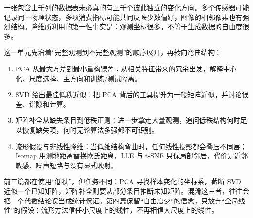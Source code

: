 一张包含上千列的数据表未必真的有上千个彼此独立的变化方向。多个传感器可能记录同一物理状态，多项消费指标可能共同反映少数偏好，图像的相邻像素也有强烈结构。降维所利用的第一性事实是：观测坐标很多，不等于生成数据的自由度很多。

这一单元先沿着``完整观测到不完整观测''的顺序展开，再转向弯曲结构：

\begin{enumerate}
\def\labelenumi{\arabic{enumi}.}
\tightlist
\item
  PCA 从最大方差到最小重构误差：从相关特征带来的冗余出发，解释中心化、尺度选择、主方向和训练/测试隔离。
\item
  SVD 给出最佳低秩近似：把 PCA 背后的工具提升为一般矩阵近似，并讨论误差、谱隙和计算。
\item
  矩阵补全从缺失条目到低秩正则：进一步拿走大量观测，追问低秩结构何时足以恢复缺失项，何时无论算法多强都不可识别。
\item
  流形假设与非线性降维：当低维结构弯曲时，任何线性投影都会叠压不同层；Isomap 用测地距离替换欧氏距离，LLE 与 t-SNE 只保局部邻居，代价是近邻敏感、噪声短路与没有显式映射。
\end{enumerate}

前三篇都在使用``低秩''，但任务不同：PCA 寻找样本变化的坐标系，截断 SVD 近似一个已知矩阵，矩阵补全则要从部分条目推断未知矩阵。混淆这三者，往往会把一个代数结论误当成统计保证。第四篇保留``自由度少''的信念，只放弃``全局线性''的假设：流形方法信任小尺度上的线性，不再相信大尺度上的线性。
